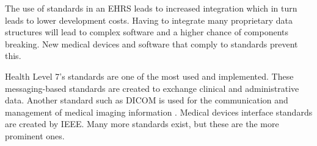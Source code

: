        The use of standards in an EHRS leads to increased integration which in turn leads to lower development costs. Having to integrate many proprietary data structures will lead to complex software and a higher chance of components breaking. New medical devices and software that comply to standards prevent this.

        Health Level 7's standards are one of the most used and implemented. These messaging-based standards are created to exchange clinical and administrative data. Another standard such as DICOM is used for the communication and management of medical imaging information \cite{mildenberger2002introduction}. Medical devices interface standards are created by IEEE. Many more standards exist, but these are the more prominent ones.
